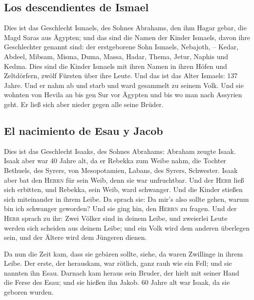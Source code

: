 \hypertarget{los-descendientes-de-ismael}{%
\subsection{Los descendientes de
Ismael}\label{los-descendientes-de-ismael}}

 Dies ist das Geschlecht Ismaels, des Sohnes Abrahams,
den ihm Hagar gebar, die Magd Saras aus Ägypten;  und das
sind die Namen der Kinder Ismaels, davon ihre Geschlechter genannt sind:
der erstgeborene Sohn Ismaels, Nebajoth, -- Kedar, Abdeel, Mibsam,
 Misma, Duma, Massa,  Hadar, Thema, Jetur,
Naphis und Kedma.  Dies sind die Kinder Ismaels mit ihren
Namen in ihren Höfen und Zeltdörfern, zwölf Fürsten über ihre Leute.
 Und das ist das Alter Ismaels: 137 Jahre. Und er nahm ab
und starb und ward gesammelt zu seinem Volk.  Und sie
wohnten von Hevila an bis gen Sur vor Ägypten und bis wo man nach
Assyrien geht. Er ließ sich aber nieder gegen alle seine Brüder.

\hypertarget{el-nacimiento-de-esau-y-jacob}{%
\subsection{El nacimiento de Esau y
Jacob}\label{el-nacimiento-de-esau-y-jacob}}

 Dies ist das Geschlecht Isaaks, des Sohnes Abrahams:
Abraham zeugte Isaak.  Isaak aber war 40 Jahre alt, da er
Rebekka zum Weibe nahm, die Tochter Bethuels, des Syrers, von
Mesopotamien, Labans, des Syrers, Schwester.  Isaak aber
bat den \textsc{Herrn} für sein Weib, denn sie war unfruchtbar. Und der
\textsc{Herr} ließ sich erbitten, und Rebekka, sein Weib, ward
schwanger.  Und die Kinder stießen sich miteinander in
ihrem Leibe. Da sprach sie: Da mir's also sollte gehen, warum bin ich
schwanger geworden? Und sie ging hin, den \textsc{Herrn} zu fragen.
 Und der \textsc{Herr} sprach zu ihr: Zwei Völker sind in
deinem Leibe, und zweierlei Leute werden sich scheiden aus deinem Leibe;
und ein Volk wird dem anderen überlegen sein, und der Ältere wird dem
Jüngeren dienen.

 Da nun die Zeit kam, dass sie gebären sollte, siehe, da
waren Zwillinge in ihrem Leibe.  Der erste, der
herauskam, war rötlich, ganz rauh wie ein Fell; und sie nannten ihn
Esau.  Darnach kam heraus sein Bruder, der hielt mit
seiner Hand die Ferse des Esau; und sie hießen ihn Jakob. 60 Jahre alt
war Isaak, da sie geboren wurden.


